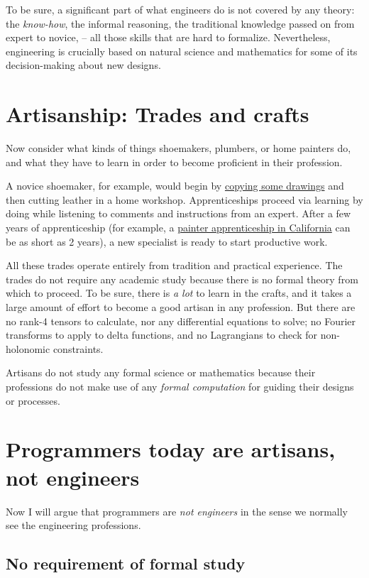 To be sure, a significant part of what engineers do is not covered
by any theory: the \emph{know-how}, the informal reasoning, the traditional
knowledge passed on from expert to novice,  –  all those skills that
are hard to formalize. Nevertheless, engineering is crucially based
on natural science and mathematics for some of its decision-making
about new designs.

\section{Artisanship: Trades and crafts }

Now consider what kinds of things shoemakers, plumbers, or home painters
do, and what they have to learn in order to become proficient in their
profession.

A novice shoemaker, for example, would begin by \href{https://youtu.be/cY5MY0czMAk?t=141}{copying some drawings}
and then cutting leather in a home workshop. Apprenticeships proceed
via learning by doing while listening to comments and instructions
from an expert. After a few years of apprenticeship (for example,
a \href{http://www.calapprenticeship.org/programs/painter_apprenticeship.php}{painter apprenticeship in California}
can be as short as 2 years), a new specialist is ready to start productive
work. 

All these trades operate entirely from tradition and practical experience.
The trades do not require any academic study because there is no formal
theory from which to proceed. To be sure, there is \emph{a lot} to
learn in the crafts, and it takes a large amount of effort to become
a good artisan in any profession. But there are no rank-4 tensors
to calculate, nor any differential equations to solve; no Fourier
transforms to apply to delta functions, and no Lagrangians to check
for non-holonomic constraints.

Artisans do not study any formal science or mathematics because their
professions do not make use of any \emph{formal computation} for guiding
their designs or processes.

\section{Programmers today are artisans, not engineers }

Now I will argue that programmers are \emph{not engineers} in the
sense we normally see the engineering professions.

\subsection{No requirement of formal study }

